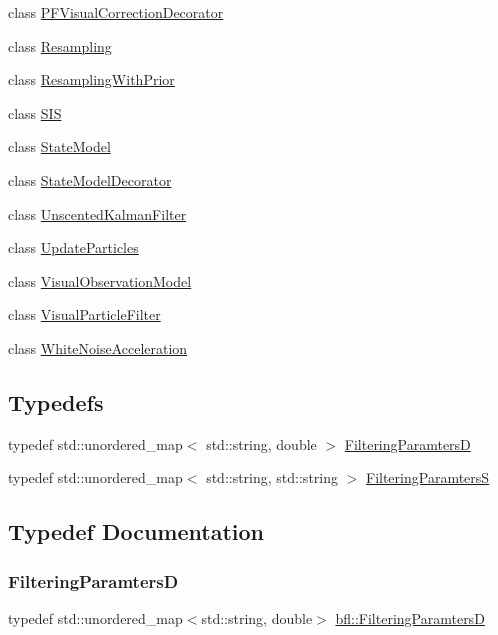 \begin{DoxyCompactItemize}
class \mbox{\hyperlink{classbfl_1_1PFVisualCorrectionDecorator}{P\+F\+Visual\+Correction\+Decorator}}
\item 
class \mbox{\hyperlink{classbfl_1_1Resampling}{Resampling}}
\item 
class \mbox{\hyperlink{classbfl_1_1ResamplingWithPrior}{Resampling\+With\+Prior}}
\item 
class \mbox{\hyperlink{classbfl_1_1SIS}{S\+IS}}
\item 
class \mbox{\hyperlink{classbfl_1_1StateModel}{State\+Model}}
\item 
class \mbox{\hyperlink{classbfl_1_1StateModelDecorator}{State\+Model\+Decorator}}
\item 
class \mbox{\hyperlink{classbfl_1_1UnscentedKalmanFilter}{Unscented\+Kalman\+Filter}}
\item 
class \mbox{\hyperlink{classbfl_1_1UpdateParticles}{Update\+Particles}}
\item 
class \mbox{\hyperlink{classbfl_1_1VisualObservationModel}{Visual\+Observation\+Model}}
\item 
class \mbox{\hyperlink{classbfl_1_1VisualParticleFilter}{Visual\+Particle\+Filter}}
\item 
class \mbox{\hyperlink{classbfl_1_1WhiteNoiseAcceleration}{White\+Noise\+Acceleration}}
\end{DoxyCompactItemize}
\subsection*{Typedefs}
\begin{DoxyCompactItemize}
\item 
typedef std\+::unordered\+\_\+map$<$ std\+::string, double $>$ \mbox{\hyperlink{namespacebfl_aeab050cf5b080512a10c1fec72921f0c}{Filtering\+ParamtersD}}
\item 
typedef std\+::unordered\+\_\+map$<$ std\+::string, std\+::string $>$ \mbox{\hyperlink{namespacebfl_aaa1677d9f16c84aac08a5a0bf36a0fa6}{Filtering\+ParamtersS}}
\end{DoxyCompactItemize}


\subsection{Typedef Documentation}
\mbox{\label{namespacebfl_aeab050cf5b080512a10c1fec72921f0c}} 
\subsubsection{\texorpdfstring{Filtering\+ParamtersD}{FilteringParamtersD}}
{\footnotesize\ttfamily typedef std\+::unordered\+\_\+map$<$std\+::string, double$>$ \mbox{\hyperlink{namespacebfl_aeab050cf5b080512a10c1fec72921f0c}{bfl\+::\+Filtering\+ParamtersD}}}



